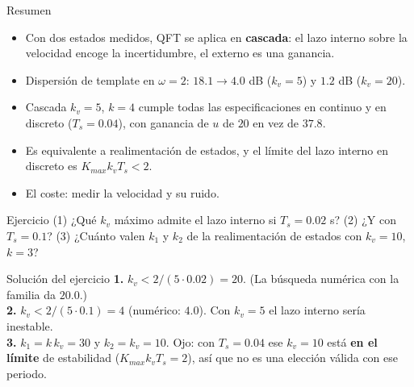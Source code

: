 \documentclass[aspectratio=169,11pt]{beamer}
\begin{document}
\begin{frame}{Resumen}
  \small
  \begin{itemize}
    \item Con dos estados medidos, QFT se aplica en \textbf{cascada}: el lazo interno sobre la velocidad encoge la incertidumbre, el externo es una ganancia.
    \item Dispersión de template en $\omega=2$: $18.1\to4.0$ dB ($k_v=5$) y $1.2$ dB ($k_v=20$).
    \item Cascada $k_v=5$, $k=4$ cumple todas las especificaciones en continuo y en discreto ($T_s=0.04$), con ganancia de $u$ de $20$ en vez de $37.8$.
    \item Es equivalente a realimentación de estados, y el límite del lazo interno en discreto es $K_{max}k_vT_s<2$.
    \item El coste: medir la velocidad y su ruido.
  \end{itemize}
  \begin{block}{Ejercicio}
    (1) ¿Qué $k_v$ máximo admite el lazo interno si $T_s=0.02$ s? (2) ¿Y con $T_s=0.1$? (3) ¿Cuánto valen $k_1$ y $k_2$ de la realimentación de estados con $k_v=10$, $k=3$?
  \end{block}
\end{frame}

\appendix
\begin{frame}{Solución del ejercicio}
  \footnotesize
  \textbf{1.} $k_v<2/(5\cdot0.02)=20$. (La búsqueda numérica con la familia da $20.0$.)\\[3pt]
  \textbf{2.} $k_v<2/(5\cdot0.1)=4$ (numérico: $4.0$). Con $k_v=5$ el lazo interno sería inestable.\\[3pt]
  \textbf{3.} $k_1=k\,k_v=30$ y $k_2=k_v=10$. Ojo: con $T_s=0.04$ ese $k_v=10$ está \textbf{en el límite} de estabilidad ($K_{max}k_vT_s=2$), así que no es una elección válida con ese periodo.
\end{frame}
\end{document}
